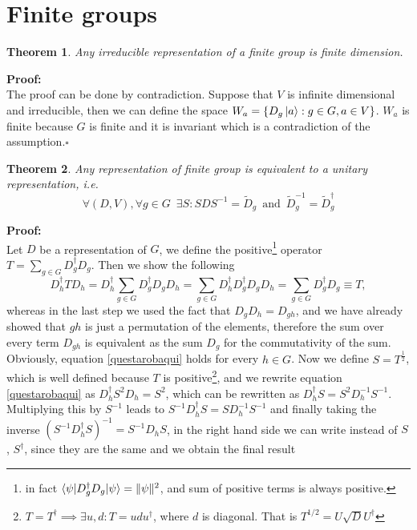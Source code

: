 \documentclass[12pt]{book}
\theoremstyle{plain}
\newtheorem{thm}{Theorem}[section]
\theoremstyle{definition}
\theoremstyle{remark}
\begin{document}
\section{Finite groups}
\begin{thm}
Any irreducible representation of a finite group is finite dimension.
\end{thm}
\hspace{-1.4em}\textbf{Proof:}\\
The proof can be done by contradiction. Suppose that $V$ is infinite dimensional and irreducible, then we can define the space $W_a = \{D_g \ket{a}:g\in G,a\in V\}$. $W_a$ is finite because $G$ is finite and it is invariant which is a contradiction of the assumption.\hfill\ensuremath{\square}
\begin{thm}
Any representation of finite group is equivalent to a unitary representation, i.e.
\[\forall (D,V),\forall g\in G \,\,\, \exists S:SDS^{-1} = \widetilde{D}_g \,\,\,\text{and}\,\,\, \widetilde{D}_g^{-1} = \widetilde{D}_g^\dagger  \]
\end{thm}
\hspace{-1.4em}\textbf{Proof:}\\
Let $D$ be a representation of $G$, we define the positive\footnote{in fact $\braket{\psi|D^\dagger_gD_g|\psi}=\|\psi\|^2$, and sum of positive terms is always positive.} operator $T = \displaystyle\sum_{g\in G}D^\dagger_gD_g$. Then we show the following
\begin{equation}\label{questarobaqui}
D_h^\dagger T D_h = D_h^\dagger \sum_{g\in G} D_g^\dagger D_g D_h = \sum_{g\in G} D_h^\dagger D_g^\dagger D_gD_h = \sum_{g\in G} D_g^\dagger D_g  \equiv T,
\end{equation}
whereas in the last step we used the fact that $D_gD_h = D_{gh}$, and we have already showed that $gh$ is just a permutation of the elements, therefore the sum over every term $D_{gh}$ is equivalent as the sum $D_g$ for the commutativity of the sum. Obviously, equation \eqref{questarobaqui} holds for every $h\in G$. Now we define $S =T^{\frac{1}{2}}$, which is well defined because $T$ is positive\footnote{$T= T^\dagger\implies \exists u,d:T=udu^\dagger$, where $d$ is diagonal. That is $T^{1/2}=U\sqrt{D}U^\dagger$}, and we rewrite equation \eqref{questarobaqui}
as $D_h^\dagger S^2 D_h = S^2$, which can be rewritten as $D_h^\dagger S = S^2 D_h^{-1}S^{-1}$. Multiplying this by $S^{-1}$ leads to $S^{-1}D_h^\dagger S = SD_h^{-1}S^{-1}$ and finally taking the inverse $(S^{-1}D_h^\dagger S)^{-1} = S^{-1}D_hS$, in the right hand side we can write instead of $S$, $S^\dagger$, since they are the same and we obtain the final result
\end{document}
